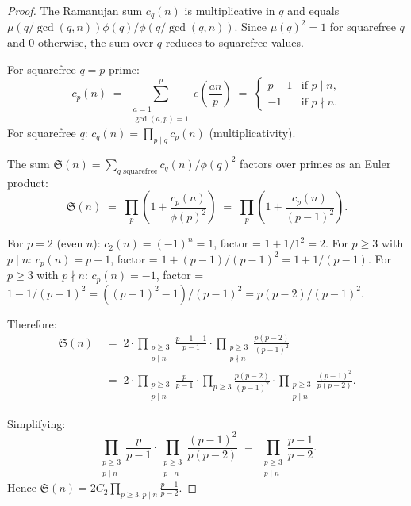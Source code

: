 \documentclass[12pt,a4paper]{amsart}
\theoremstyle{definition}
\newcommand{\eq}[1]{e\!\left(#1\right)}
\begin{document}
\begin{proof}
  The Ramanujan sum $c_q(n)$ is multiplicative in $q$ and equals
  $\mu(q/\gcd(q,n)) \phi(q)/\phi(q/\gcd(q,n))$.  Since $\mu(q)^2 = 1$
  for squarefree $q$ and $0$ otherwise, the sum over $q$ reduces to
  squarefree values.

  For squarefree $q = p$ prime:
  \[
    c_p(n) \;=\; \sum_{\substack{a=1\\ \gcd(a,p)=1}}^{p} \eq{\frac{an}{p}}
    \;=\; \begin{cases} p-1 & \text{if } p \mid n, \\ -1 & \text{if } p \nmid n. \end{cases}
  \]
  For squarefree $q$: $c_q(n) = \prod_{p \mid q} c_p(n)$ (multiplicativity).

  The sum $\mathfrak{S}(n) = \sum_{q \text{ squarefree}} c_q(n)/\phi(q)^2$
  factors over primes as an Euler product:
  \[
    \mathfrak{S}(n)
    \;=\; \prod_{p} \left(1 + \frac{c_p(n)}{\phi(p)^2}\right)
    \;=\; \prod_{p} \left(1 + \frac{c_p(n)}{(p-1)^2}\right).
  \]

  For $p = 2$ (even $n$): $c_2(n) = (-1)^n = 1$, factor = $1 + 1/1^2 = 2$.
  For $p \geq 3$ with $p \mid n$: $c_p(n) = p-1$, factor = $1 + (p-1)/(p-1)^2 = 1 + 1/(p-1)$.
  For $p \geq 3$ with $p \nmid n$: $c_p(n) = -1$, factor = $1 - 1/(p-1)^2 = ((p-1)^2-1)/(p-1)^2 = p(p-2)/(p-1)^2$.

  Therefore:
  \begin{align*}
    \mathfrak{S}(n)
    &\;=\; 2 \cdot \prod_{\substack{p \geq 3 \\ p \mid n}}
             \frac{p-1+1}{p-1} \cdot \prod_{\substack{p \geq 3 \\ p \nmid n}}
             \frac{p(p-2)}{(p-1)^2} \\
    &\;=\; 2 \cdot \prod_{\substack{p \geq 3 \\ p \mid n}} \frac{p}{p-1}
             \cdot \prod_{p \geq 3} \frac{p(p-2)}{(p-1)^2}
             \cdot \prod_{\substack{p \geq 3 \\ p \mid n}} \frac{(p-1)^2}{p(p-2)}.
  \end{align*}

  Simplifying:
  \[
    \prod_{\substack{p \geq 3 \\ p \mid n}} \frac{p}{p-1}
    \cdot \prod_{\substack{p \geq 3 \\ p \mid n}} \frac{(p-1)^2}{p(p-2)}
    \;=\; \prod_{\substack{p \geq 3 \\ p \mid n}} \frac{p-1}{p-2}.
  \]
  Hence $\mathfrak{S}(n) = 2 C_2 \prod_{p \geq 3, p \mid n} \frac{p-1}{p-2}$.
\end{proof}
\end{document}
